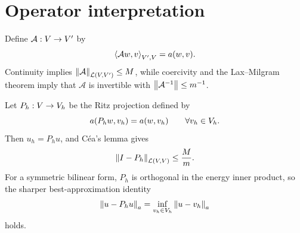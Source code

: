 \section{Operator interpretation}
\label{app:operator}

Define $\mathcal A:V\to V'$ by
\begin{equation}
  \left\langle \mathcal Aw,v \right\rangle_{V',V}=a(w,v).
  \label{eq:operator-definition}
\end{equation}
Continuity implies $\left\lVert \mathcal A \right\rVert_{\mathcal L(V,V')}\leq M$, while
coercivity and the Lax--Milgram theorem imply that $\mathcal A$ is invertible
with $\left\lVert \mathcal A^{-1} \right\rVert\leq m^{-1}$.

Let $P_h:V\to V_h$ be the Ritz projection defined by
\begin{equation}
  a(P_hw,v_h)=a(w,v_h)
  \qquad\forall v_h\in V_h.
  \label{eq:ritz-projection}
\end{equation}
Then $u_h=P_hu$, and C\'ea's lemma gives
\begin{equation}
  \left\lVert I-P_h \right\rVert_{\mathcal L(V,V)}
  \leq \frac{M}{m}.
  \label{eq:ritz-bound}
\end{equation}
For a symmetric bilinear form, $P_h$ is orthogonal in the energy inner
product, so the sharper best-approximation identity
\begin{equation}
  \left\lVert u-P_hu \right\rVert_{a}
  =\inf_{v_h\in V_h}\left\lVert u-v_h \right\rVert_{a}
  \label{eq:energy-best-approximation}
\end{equation}
holds.
